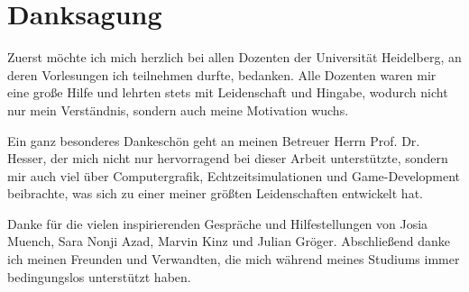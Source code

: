 
\chapter*{Danksagung}
Zuerst möchte ich mich herzlich bei allen Dozenten der Universität Heidelberg, an deren Vorlesungen ich teilnehmen durfte, bedanken. Alle Dozenten waren mir eine große Hilfe und lehrten stets mit Leidenschaft und Hingabe, wodurch nicht nur mein Verständnis, sondern auch meine Motivation wuchs.

Ein ganz besonderes Dankeschön geht an meinen Betreuer Herrn Prof. Dr. Hesser, der mich nicht nur hervorragend bei dieser Arbeit unterstützte, sondern mir auch viel über Computergrafik, Echtzeitsimulationen und Game-Development beibrachte, was sich zu einer meiner größten Leidenschaften entwickelt hat.

Danke für die vielen inspirierenden Gespräche und Hilfestellungen von Josia Muench, Sara Nonji Azad, Marvin Kinz und Julian Gröger. Abschließend danke ich meinen Freunden und Verwandten, die mich während meines Studiums immer bedingungslos unterstützt haben.
